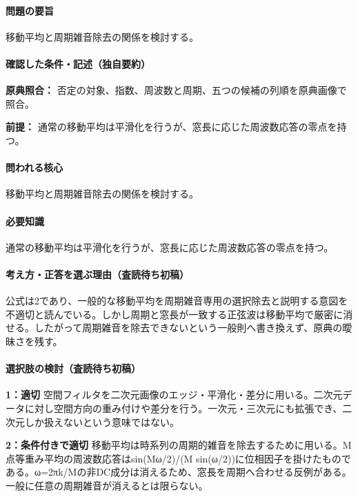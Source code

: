\paragraph{問題の要旨} 移動平均と周期雑音除去の関係を検討する。

\paragraph{確認した条件・記述（独自要約）}\mbox{}\par

\noindent\textbf{原典照合：} 否定の対象、指数、周波数と周期、五つの候補の列順を原典画像で照合。\par

\noindent\textbf{前提：} 通常の移動平均は平滑化を行うが、窓長に応じた周波数応答の零点を持つ。\par

\paragraph{問われる核心} 移動平均と周期雑音除去の関係を検討する。

\paragraph{必要知識} 通常の移動平均は平滑化を行うが、窓長に応じた周波数応答の零点を持つ。

\paragraph{考え方・正答を選ぶ理由（査読待ち初稿）} 公式は2であり、一般的な移動平均を周期雑音専用の選択除去と説明する意図を不適切と読んでいる。しかし周期と窓長が一致する正弦波は移動平均で厳密に消せる。したがって周期雑音を除去できないという一般則へ書き換えず、原典の曖昧さを残す。

\paragraph{選択肢の検討（査読待ち初稿）}\mbox{}\par

\noindent\textbf{1：適切} 空間フィルタを二次元画像のエッジ・平滑化・差分に用いる。二次元データに対し空間方向の重み付けや差分を行う。一次元・三次元にも拡張でき、二次元しか扱えないという意味ではない。\par

\noindent\textbf{2：条件付きで適切} 移動平均は時系列の周期的雑音を除去するために用いる。M点等重み平均の周波数応答はsin(Mω/2)/(M sin(ω/2))に位相因子を掛けたものである。ω=2πk/Mの非DC成分は消えるため、窓長を周期へ合わせる反例がある。一般に任意の周期雑音が消えるとは限らない。\par

